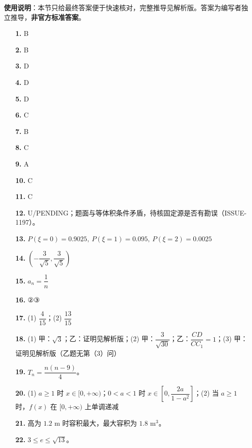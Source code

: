 
\begin{gknotice}
\textbf{使用说明}：本节只给最终答案便于快速核对，完整推导见解析版。答案为编写者独立推导，\textbf{非官方标准答案}。
\end{gknotice}

\begin{itemize}[leftmargin=2.6em]
  \item[\textbf{1.}] B
  \item[\textbf{2.}] B
  \item[\textbf{3.}] D
  \item[\textbf{4.}] D
  \item[\textbf{5.}] D
  \item[\textbf{6.}] C
  \item[\textbf{7.}] B
  \item[\textbf{8.}] C
  \item[\textbf{9.}] A
  \item[\textbf{10.}] C
  \item[\textbf{11.}] C
  \item[\textbf{12.}] U/PENDING；题面与等体积条件矛盾，待核固定源是否有勘误（ISSUE-1197）。
  \item[\textbf{13.}] $P(\xi=0)=0.9025,\ P(\xi=1)=0.095,\ P(\xi=2)=0.0025$
  \item[\textbf{14.}] $\left(-\dfrac3{\sqrt5},\dfrac3{\sqrt5}\right)$
  \item[\textbf{15.}] $a_n=\dfrac1n$
  \item[\textbf{16.}] ②③
  \item[\textbf{17.}] (1) $\dfrac4{15}$；(2) $\dfrac{13}{15}$
  \item[\textbf{18.}] (1) 甲：$\sqrt3$；乙：证明见解析版；(2) 甲：$\dfrac3{\sqrt{30}}$；乙：$\dfrac{CD}{CC_1}=1$；(3) 甲：证明见解析版（乙题无第（3）问）
  \item[\textbf{19.}] $T_n=\dfrac{n(n-9)}4$。
  \item[\textbf{20.}] (1) $a\ge1$ 时 $x\in[0,+\infty)$；$0<a<1$ 时 $x\in\left[0,\dfrac{2a}{1-a^2}\right]$；(2) 当 $a\ge1$ 时，$f(x)$ 在 $[0,+\infty)$ 上单调递减
  \item[\textbf{21.}] 高为 $1.2$ m 时容积最大，最大容积为 $1.8$ m$^3$。
  \item[\textbf{22.}] $3\le e\le\sqrt{13}$。
\end{itemize}
